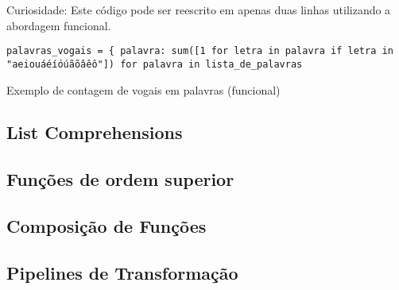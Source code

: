 \documentclass[date,twocolumn,a4paper]{ppgem}
\begin{document}
\pagebreak
Curiosidade: Este código pode ser reescrito em apenas duas linhas utilizando a abordagem funcional.


\begin{listing}[!ht]
\begin{verbatim}
palavras_vogais = { palavra: sum([1 for letra in palavra if letra in "aeiouáéíóúãõâêô"]) for palavra in lista_de_palavras
\end{verbatim}
\caption{Exemplo de contagem de vogais em palavras (funcional)}
\label{listing:2}
\end{listing}


\subsection{List Comprehensions}
\subsection{Funções de ordem superior}
\subsection{Composição de Funções}
\subsection{Pipelines de Transformação}
\end{document}
